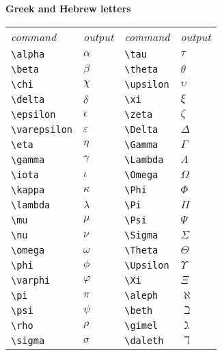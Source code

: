 \documentclass[10pt,landscape]{article}
\newcommand{\ColorSubsection}[1]{\par\vspace{1ex}\noindent\textcolor{subsectioncolor}{\normalsize\bfseries #1}\par\vspace{0.5ex}}
\begin{document}
\begin{multicols}{3}
\ColorSubsection{Greek and Hebrew letters}
\begin{tabular}{llll}
\emph{command} & \emph{output}&\emph{command} & \emph{output}\\
\verb!\alpha! & $\alpha$&\verb!\tau! & $\tau$\\
\verb!\beta! & $\beta$&\verb!\theta! & $\theta$\\
\verb!\chi! & $\chi$&\verb!\upsilon! & $\upsilon$\\
\verb!\delta! & $\delta$&\verb!\xi! & $\xi$\\
\verb!\epsilon! & $\epsilon$&\verb!\zeta! & $\zeta$\\
\verb!\varepsilon! & $\varepsilon$&\verb!\Delta! & $\Delta$\\
\verb!\eta! & $\eta$&\verb!\Gamma! & $\Gamma$\\
\verb!\gamma! & $\gamma$&\verb!\Lambda! & $\Lambda$\\
\verb!\iota! & $\iota$&\verb!\Omega! & $\Omega$\\
\verb!\kappa! & $\kappa$&\verb!\Phi! & $\Phi$\\
\verb!\lambda! & $\lambda$&\verb!\Pi! & $\Pi$\\
\verb!\mu! & $\mu$&\verb!\Psi! & $\Psi$\\
\verb!\nu! & $\nu$&\verb!\Sigma! & $\Sigma$\\
\verb!\omega! & $\omega$&\verb!\Theta! & $\Theta$\\
\verb!\phi! & $\phi$&\verb!\Upsilon! & $\Upsilon$\\
\verb!\varphi! & $\varphi$&\verb!\Xi! & $\Xi$\\
\verb!\pi! & $\pi$&\verb!\aleph! & $\aleph$\\
\verb!\psi! & $\psi$&\verb!\beth! & $\beth$\\
\verb!\rho! & $\rho$&\verb!\gimel! & $\gimel$\\
\verb!\sigma! & $\sigma$&\verb!\daleth! & $\daleth$
\end{tabular}



\end{multicols}
\end{document}
